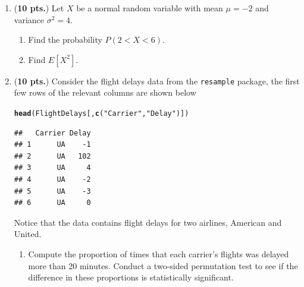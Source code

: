 \documentclass[13pt]{article}\usepackage[]{graphicx}\usepackage[]{color}
\makeatletter
\newcommand{\hlstr}[1]{\textcolor[rgb]{0.192,0.494,0.8}{#1}}%
\newcommand{\hlstd}[1]{\textcolor[rgb]{0.345,0.345,0.345}{#1}}%
\newcommand{\hlkwd}[1]{\textcolor[rgb]{0.737,0.353,0.396}{\textbf{#1}}}%
\newenvironment{kframe}{%
 \def\at@end@of@kframe{}%
 \ifinner\ifhmode%
  \def\at@end@of@kframe{\end{minipage}}%
  \begin{minipage}{\columnwidth}%
 \fi\fi%
 \def\FrameCommand##1{\hskip\@totalleftmargin \hskip-\fboxsep
 \colorbox{shadecolor}{##1}\hskip-\fboxsep
     \hskip-\linewidth \hskip-\@totalleftmargin \hskip\columnwidth}%
 \MakeFramed {\advance\hsize-\width
   \@totalleftmargin\z@ \linewidth\hsize
   \@setminipage}}%
 {\par\unskip\endMakeFramed%
 \at@end@of@kframe}
\newenvironment{knitrout}{}{} %
\makeatother
\begin{document}
{\begin{enumerate}
    
\newpage

\item ({\bf 10 pts.}) Let $X$ be a normal random variable with mean $\mu = -2$ and variance $\sigma^2 = 4$. 
  \begin{enumerate}
      \item Find the probability $P(2 < X < 6)$.
      \item Find $E[X^2]$. 
  \end{enumerate}
  
  \newpage 
  
  \item ({\bf 10 pts.})  Consider the flight delays data from the {\tt resample} package, the first few rows of the relevant columns are shown below
\begin{knitrout}
\color{fgcolor}\begin{kframe}
\begin{alltt}
\hlkwd{head}\hlstd{(FlightDelays[,}\hlkwd{c}\hlstd{(}\hlstr{"Carrier"}\hlstd{,}\hlstr{"Delay"}\hlstd{)])}
\end{alltt}
\begin{verbatim}
##   Carrier Delay
## 1      UA    -1
## 2      UA   102
## 3      UA     4
## 4      UA    -2
## 5      UA    -3
## 6      UA     0
\end{verbatim}
\end{kframe}
\end{knitrout}
  Notice that the data contains flight delays for two airlines, American and United. 

  \begin{enumerate}
  \item Compute the proportion of times that each carrier's flights was delayed more than 20 minutes. Conduct a two-sided permutation test to see if the     difference in these proportions is statistically significant. 
  \end{enumerate}

\newpage 


\end{enumerate}}
\end{document}
